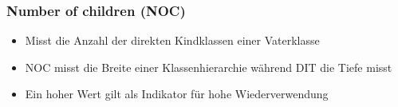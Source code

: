 \begin{frame}[fragile]
	\frametitle{Number of children (NOC)}
		\begin{itemize}
		  \item Misst die Anzahl der direkten Kindklassen einer Vaterklasse
			\item NOC misst die Breite einer Klassenhierarchie während DIT die Tiefe misst
			\item Ein hoher Wert gilt als Indikator für hohe Wiederverwendung
		\end{itemize}
\end{frame}
